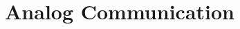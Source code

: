 \documentclass[../course]{subfiles}
\begin{document}
\chapter{Analog Communication}


\end{document}
